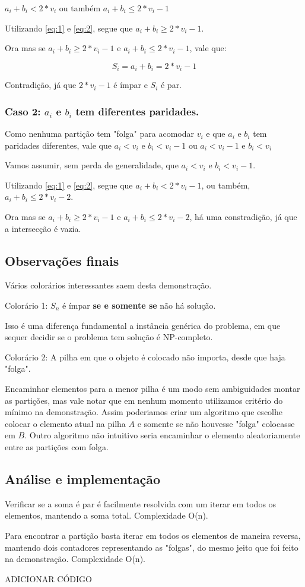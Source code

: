 $a_i + b_i < 2*v_i$ ou também $a_i + b_i \leq 2*v_i - 1$

Utilizando \ref{eq:1} e \ref{eq:2}, segue que $a_i + b_i \geq 2*v_i - 1$.

Ora mas se $a_i + b_i \geq 2*v_i - 1$ e $a_i + b_i \leq 2*v_i - 1$, vale que:

$$S_i = a_i + b_i = 2*v_i - 1$$

Contradição, já que $2*v_i - 1$ é ímpar e $S_i$ é par.

\subsubsection*{Caso 2: $a_i$ e $b_i$ tem diferentes paridades.}

Como nenhuma partição tem "folga" para acomodar $v_i$ e que $a_i$ e $b_i$ tem paridades diferentes, vale que $a_i < v_i$ e $b_i < v_i - 1$ ou $a_i < v_i - 1$ e $b_i < v_i$

Vamos assumir, sem perda de generalidade, que $a_i < v_i$ e $b_i < v_i - 1$.

Utilizando \ref{eq:1} e \ref{eq:2}, segue que $a_i + b_i < 2*v_i - 1$, ou também, $a_i + b_i \leq 2*v_i - 2$.

Ora mas se $a_i + b_i \geq 2*v_i - 1$ e $a_i + b_i \leq 2*v_i - 2$, há uma constradição, já que a intersecção é vazia.

\subsection*{Observações finais}

Vários colorários interessantes saem desta demonstração.

Colorário 1: $S_n$ é ímpar \textbf{se e somente se} não há solução.

Isso é uma diferença fundamental a instância genérica do problema, em que sequer decidir se o problema tem solução é NP-completo.

Colorário 2: A pilha em que o objeto é colocado não importa, desde que haja "folga".

Encaminhar elementos para a menor pilha é um modo sem ambiguidades montar as partições, mas vale notar que em nenhum momento utilizamos critério do mínimo na demonstração. Assim poderiamos criar um algoritmo que escolhe colocar o elemento atual na pilha $A$ e somente se não houvesse "folga" colocasse em $B$. Outro algoritmo não intuitivo seria encaminhar o elemento aleatoriamente entre as partições com folga.

\subsection*{Análise e implementação}

Verificar se a soma é par é facilmente resolvida com um iterar em todos os elementos, mantendo a soma total. Complexidade O(n).

Para encontrar a partição basta iterar em todos os elementos de maneira reversa, mantendo dois contadores representando as "folgas", do mesmo jeito que foi feito na demonstração. Complexidade O(n).

ADICIONAR CÓDIGO
